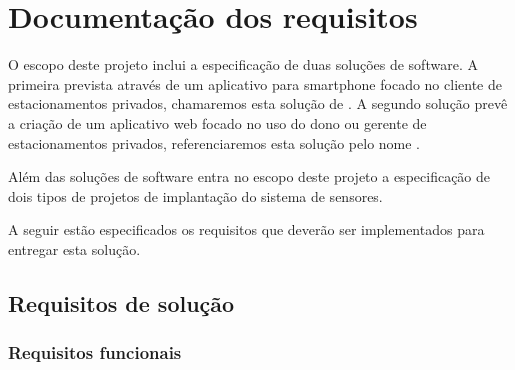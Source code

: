 \section{Documentação dos requisitos}

O escopo deste projeto inclui a especificação de duas soluções de software. A primeira prevista através de um aplicativo para smartphone focado no cliente de estacionamentos privados, chamaremos esta solução de \userMobileAppName{}. A segundo solução prevê a criação de um aplicativo web focado no uso do dono ou gerente de estacionamentos privados, referenciaremos esta solução pelo nome \parkingWebAppName{}.

Além das soluções de software entra no escopo deste projeto a especificação de dois tipos de projetos de implantação do sistema de sensores.

A seguir estão especificados os requisitos que deverão ser implementados para entregar esta solução.



\subsection{Requisitos de solução}

\subsubsection{Requisitos funcionais}


